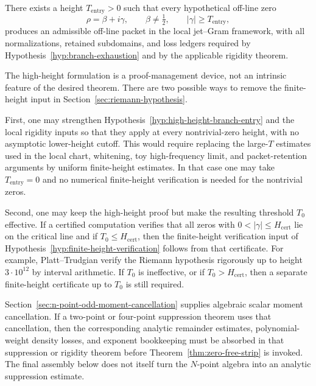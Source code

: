 \begin{hypothesis}
\label{hyp:high-height-branch-entry}
There exists a height \(T_{\mathrm{entry}}>0\) such that every hypothetical
off-line zero
\[
        \rho=\beta+i\gamma,
        \qquad \beta\ne \tfrac12,
        \qquad |\gamma|\ge T_{\mathrm{entry}},
\]
produces an admissible off-line packet in the local jet--Gram framework, with
all normalizations, retained subdomains, and loss ledgers required by
Hypothesis~\ref{hyp:branch-exhaustion} and by the applicable rigidity theorem.
\end{hypothesis}

\begin{remark}
\label{rem:all-height-vs-finite-verification}
The high-height formulation is a proof-management device, not an intrinsic
feature of the desired theorem.  There are two possible ways to remove the
finite-height input in Section~\ref{sec:riemann-hypothesis}.

First, one may strengthen Hypothesis~\ref{hyp:high-height-branch-entry} and
the local rigidity inputs so that they apply at every nontrivial-zero height,
with no asymptotic lower-height cutoff.  This would require replacing the
large-\(T\) estimates used in the local chart, whitening, toy high-frequency
limit, and packet-retention arguments by uniform finite-height estimates.  In
that case one may take \(T_{\mathrm{entry}}=0\) and no numerical finite-height
verification is needed for the nontrivial zeros.

Second, one may keep the high-height proof but make the resulting threshold
\(T_0\) effective.  If a certified computation verifies that all zeros with
\(0<|\gamma|\le H_{\mathrm{cert}}\) lie on the critical line and if
\(T_0\le H_{\mathrm{cert}}\), then the finite-height verification input of
Hypothesis~\ref{hyp:finite-height-verification} follows from that certificate.
For example, Platt--Trudgian verify the Riemann hypothesis rigorously up to
height \(3\cdot10^{12}\) by interval arithmetic.  If \(T_0\) is ineffective,
or if \(T_0>H_{\mathrm{cert}}\), then a separate finite-height certificate up
to \(T_0\) is still required.
\end{remark}

\begin{remark}
\label{rem:n-point-role-in-aggregation}
Section~\ref{sec:n-point-odd-moment-cancellation} supplies algebraic scalar
moment cancellation.  If a two-point or four-point suppression theorem uses
that cancellation, then the corresponding analytic remainder estimates,
polynomial-weight density losses, and exponent bookkeeping must be absorbed in
that suppression or rigidity theorem before Theorem~\ref{thm:zero-free-strip}
is invoked.  The final assembly below does not itself turn the
\(N\)-point algebra into an analytic suppression estimate.
\end{remark}

